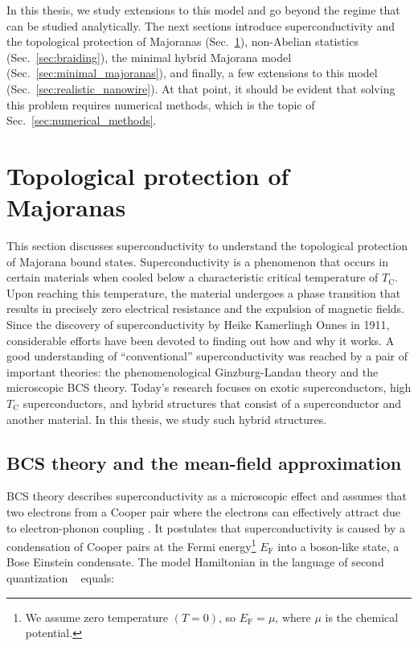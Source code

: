 In this thesis, we study extensions to this model and go beyond the regime that can be studied analytically.
The next sections introduce superconductivity and the topological protection of Majoranas (Sec.~\ref{sec:superconductivity}), non-Abelian statistics (Sec.~\ref{sec:braiding}), the minimal hybrid Majorana model (Sec.~\ref{sec:minimal_majoranas}), and finally, a few extensions to this model (Sec.~\ref{sec:realistic_nanowire}).
At that point, it should be evident that solving this problem requires numerical methods, which is the topic of Sec.~\ref{sec:numerical_methods}.




\section{Topological protection of Majoranas}\label{sec:superconductivity}
This section discusses superconductivity to understand the topological protection of Majorana bound states.
Superconductivity is a phenomenon that occurs in certain materials when cooled below a characteristic critical temperature of $T_{\mathrm{C}}$.
Upon reaching this temperature, the material undergoes a phase transition that results in precisely zero electrical resistance and the expulsion of magnetic fields.
Since the discovery of superconductivity by Heike Kamerlingh Onnes in 1911, considerable efforts have been devoted to finding out how and why it works.
A good understanding of ``conventional'' superconductivity was reached by a pair of important theories: the phenomenological Ginzburg-Landau theory and the microscopic BCS theory.
Today's research focuses on exotic superconductors, high $T_{\mathrm{C}}$ superconductors, and hybrid structures that consist of a superconductor and another material.
In this thesis, we study such hybrid structures.

\subsection{BCS theory and the mean-field approximation}\label{sec:BCS-theory}
BCS theory describes superconductivity as a microscopic effect and assumes that two electrons from a Cooper pair where the electrons can effectively attract due to electron-phonon coupling \cite{Cooper1956,Bardeen1957,Bardeen1957a}.
It postulates that superconductivity is caused by a condensation of Cooper pairs at the Fermi energy\footnote{We assume zero temperature $\left(T=0\right)$, so $E_{\textrm{F}}=\mu$, where $\mu$ is the chemical potential.} $E_{\textrm{F}}$ into a boson-like state, a Bose Einstein condensate.
The model Hamiltonian in the language of second quantization ~\cite{Gennes1999} equals:

